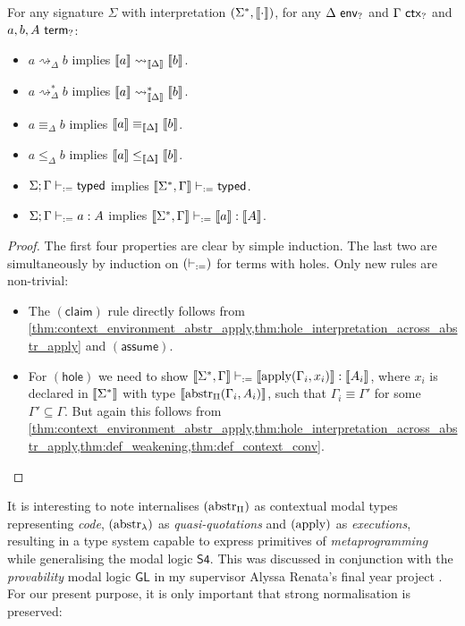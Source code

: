 \documentclass[twoside]{report}
\begin{document}
\begin{proposition}[Soundness]
    \label{thm:hole_interpretation_soundness}
    For any signature $\Sigma$ with interpretation $(\Sigma^\ast, \llbracket{\cdot}\rrbracket)$, for any $\Delta \ \mathsf{env}_{?}$ and $\Gamma \ \mathsf{ctx}_{?}$ and $a, b, A \ \mathsf{term}_{?}$:
    \begin{itemize}[noitemsep]
        \item $a \rightsquigarrow_\Delta b$ implies $\llbracket{a}\rrbracket \rightsquigarrow_{\llbracket{\Delta}\rrbracket} \llbracket{b}\rrbracket$.
        \item $a \rightsquigarrow_\Delta^\ast b$ implies $\llbracket{a}\rrbracket \rightsquigarrow_{\llbracket{\Delta}\rrbracket}^\ast \llbracket{b}\rrbracket$.
        \item $a \equiv_\Delta b$ implies $\llbracket{a}\rrbracket \equiv_{\llbracket{\Delta}\rrbracket} \llbracket{b}\rrbracket$.
        \item $a \leq_\Delta b$ implies $\llbracket{a}\rrbracket \leq_{\llbracket{\Delta}\rrbracket} \llbracket{b}\rrbracket$.
        \item $\Sigma; \Gamma \vdash_{:=} \mathsf{typed}$ implies $\llbracket{\Sigma^\ast, \Gamma}\rrbracket \vdash_{:=} \mathsf{typed}$.
        \item $\Sigma; \Gamma \vdash_{:=} a : A$ implies $\llbracket{\Sigma^\ast, \Gamma}\rrbracket \vdash_{:=} \llbracket{a}\rrbracket : \llbracket{A}\rrbracket$.
    \end{itemize}
\end{proposition}

\begin{proof}
    The first four properties are clear by simple induction. The last two are simultaneously by induction on $(\vdash_{:=})$ for terms with holes. Only new rules are non-trivial:
    \begin{itemize}[noitemsep]
        \item The $(\mathsf{claim})$ rule directly follows from \cref{thm:context_environment_abstr_apply,thm:hole_interpretation_across_abstr_apply} and $(\mathsf{assume})$.
        \item For $(\mathsf{hole})$ we need to show $\llbracket{\Sigma^\ast, \Gamma}\rrbracket \vdash_{:=} \llbracket{\operatorname{apply}(\Gamma_i, x_i)}\rrbracket : \llbracket{A_i}\rrbracket$, where $x_i$ is declared in $\llbracket{\Sigma^\ast}\rrbracket$ with type $\llbracket{\operatorname{abstr}_\Pi(\Gamma_i, A_i)}\rrbracket$, such that $\Gamma_i \equiv \Gamma'$ for some $\Gamma' \subseteq \Gamma$. But again this follows from \cref{thm:context_environment_abstr_apply,thm:hole_interpretation_across_abstr_apply,thm:def_weakening,thm:def_context_conv}. \qedhere
    \end{itemize}
\end{proof}

It is interesting to note \cite{nanevski2008contextual} internalises $(\operatorname{abstr}_\Pi)$ as contextual modal types representing \emph{code}, $(\operatorname{abstr}_\lambda)$ as \emph{quasi-quotations} and $(\operatorname{apply})$ as \emph{executions}, resulting in a type system capable to express primitives of \emph{metaprogramming} while generalising the modal logic $\mathsf{S4}$. This was discussed in conjunction with the \emph{provability} modal logic $\mathsf{GL}$ in my supervisor Alyssa Renata's final year project \cite{alyssa2019provability}. For our present purpose, it is only important that strong normalisation is preserved:
\end{document}
